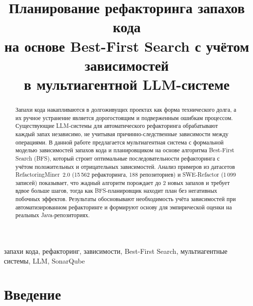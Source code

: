 \documentclass[conference]{IEEEtran}
\begin{document}
\title{Планирование рефакторинга запахов кода\\
на основе Best-First Search с учётом зависимостей\\
в мультиагентной LLM-системе}

\author{
}

\maketitle

\begin{abstract}
Запахи кода накапливаются в долгоживущих проектах как форма технического долга,
а их ручное устранение является дорогостоящим и подверженным ошибкам процессом.
Существующие LLM-системы для автоматического рефакторинга обрабатывают каждый
запах независимо, не учитывая причинно-следственные зависимости между операциями.
В данной работе предлагается мультиагентная система с формальной моделью зависимостей
запахов кода и планировщиком на основе алгоритма Best-First Search (BFS), который
строит оптимальные последовательности рефакторинга с учётом положительных и
отрицательных зависимостей.
Анализ примеров из датасетов RefactoringMiner~2.0 (15\,562 рефакторинга,
188 репозиториев) и SWE-Refactor (1\,099 записей) показывает, что жадный алгоритм
порождает до 2 новых запахов и требует вдвое больше шагов, тогда как BFS-планировщик
находит план без негативных побочных эффектов.
Результаты обосновывают необходимость учёта зависимостей при
автоматизированном рефакторинге и формируют основу для эмпирической оценки
на реальных Java-репозиториях.
\end{abstract}

\begin{IEEEkeywords}
запахи кода, рефакторинг, зависимости, Best-First Search,
мультиагентные системы, LLM, SonarQube
\end{IEEEkeywords}

\section{Введение}
\end{document}
